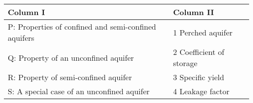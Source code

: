 \begin{center}
\begin{tabular}{|p{7cm}|p{7cm}|}
\hline
\textbf{Column I} & \textbf{Column II} \\ \hline
P: Properties of confined and semi-confined aquifers & 1 Perched aquifer \\ \hline
Q: Property of an unconfined aquifer & 2 Coefficient of storage \\ \hline
R: Property of semi-confined aquifer & 3 Specific yield \\ \hline
S: A special case of an unconfined aquifer & 4 Leakage factor \\ \hline
\end{tabular}
\end{center}